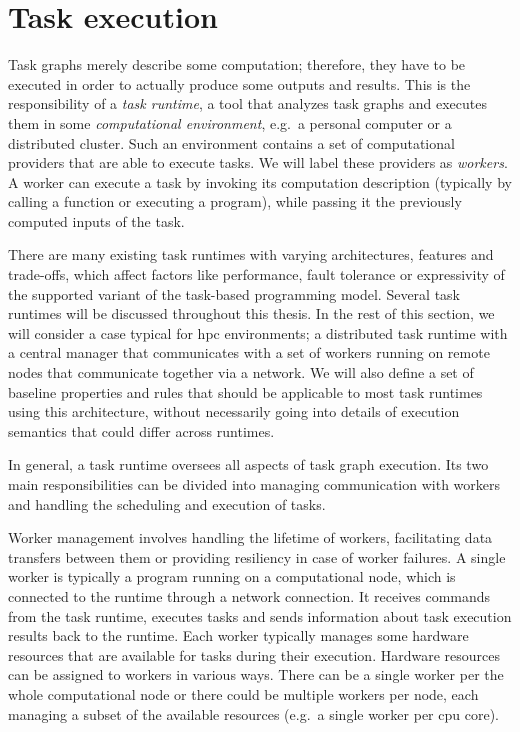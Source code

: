 \section{Task execution}
\label{sec:task-graph-execution}
Task graphs merely describe some computation; therefore, they have to be executed in order to
actually produce some outputs and results. This is the responsibility of a \emph{task runtime},
a tool that analyzes task graphs and executes them in some \emph{computational environment}, e.g.\ a
personal computer or a distributed cluster. Such an environment contains a set of computational
providers that are able to execute tasks. We will label these providers as \emph{workers}.
A worker can execute a task by invoking its computation description (typically by calling a
function or executing a program), while passing it the previously computed inputs of the task.


There are many existing task runtimes with varying architectures, features and trade-offs, which
affect factors like performance, fault tolerance or expressivity of the supported variant of the
task-based programming model. Several task runtimes will be discussed throughout this thesis. In
the rest of this section, we will consider a case typical for \gls{hpc} environments;
a distributed task runtime with a central manager that communicates with a set of workers running
on remote nodes that communicate together via a network. We will also define a set of baseline
properties and rules that should be applicable to most task runtimes using this architecture,
without necessarily going into details of execution semantics that could differ across runtimes.

In general, a task runtime oversees all aspects of task graph execution. Its two main
responsibilities can be divided into managing communication with workers and handling the
scheduling and execution of tasks.

Worker management involves handling the lifetime of workers, facilitating data transfers between
them or providing resiliency in case of worker failures. A single worker is typically a program
running on a computational node, which is connected to the runtime through a network connection. It
receives commands from the task runtime, executes tasks and sends information about task execution
results back to the runtime. Each worker typically manages some hardware resources that are
available for tasks during their execution. Hardware resources can be assigned to workers in
various ways. There can be a single worker per the whole computational node or there could be
multiple workers per node, each managing a subset of the available resources (e.g.\ a single worker
per \gls{cpu} core).

